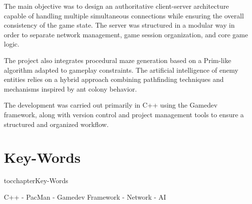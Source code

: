\documentclass[a4paper, 11pt]{report}
\begin{document}
\begin{center}
\begin{justify}
The main objective was to design an authoritative client-server architecture capable of handling multiple simultaneous connections while ensuring the overall consistency of the game state. The server was structured in a modular way in order to separate network management, game session organization, and core game logic.

The project also integrates procedural maze generation based on a Prim-like algorithm adapted to gameplay constraints. The artificial intelligence of enemy entities relies on a hybrid approach combining pathfinding techniques and mechanisms inspired by ant colony behavior.

The development was carried out primarily in C++ using the Gamedev framework, along with version control and project management tools to ensure a structured and organized workflow.
    \end{justify}
    \vspace*{\fill} %

    \section*{Key-Words}
    \addcontentsline
    {toc}{chapter}{Key-Words}
    \begin{center}
    C++ - PacMan - Gamedev Framework - Network - AI
    \end{center}
    \vspace*{\fill} %
    
    
\end{center}
\end{document}
